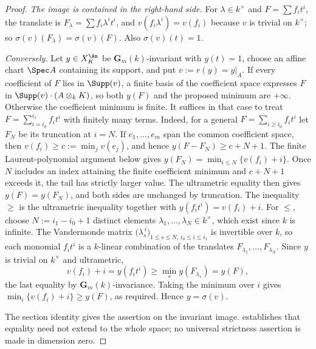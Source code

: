 \begin{proof}
\emph{The image is contained in the right-hand side.}  For
$\lambda\in k^\times$ and $F=\sum f_it^i$, the translate is
$F_\lambda=\sum f_i\lambda^it^i$, and
$v(f_i\lambda^i)=v(f_i)$ because $v$ is trivial on $k^\times$; so
$\sigma(v)(F_\lambda)=\sigma(v)(F)$.  Also $\sigma(v)(t)=1$.

\emph{Conversely.}  Let $y\in X_K^{\An}$ be $\mathbf G_m(k)$-invariant
with $y(t)=1$, choose an affine chart $\Spec A$ containing its support,
and put $v:=r(y)=y|_A$.  If every coefficient of $F$ lies in $\Supp(v)$, a finite basis of
the coefficient space expresses $F$ in
$\Supp(v)\cdot(A\otimes_kK)$, so both $y(F)$ and the proposed minimum
are $+\infty$.  Otherwise the coefficient minimum is finite.
It suffices in that case to treat
$F=\sum_{i=i_0}^{i_1}f_it^i$ with finitely many terms.  Indeed, for a
general $F=\sum_{i\geq i_0}f_it^i$ let $F_N$ be its truncation at
$i=N$.  If $e_1,\ldots,e_m$ span the common coefficient space, then
$v(f_i)\geq c:=\min_jv(e_j)$, and hence
$y(F-F_N)\geq c+N+1$.  The finite Laurent-polynomial argument below gives
$y(F_N)=\min_{i\leq N}\{v(f_i)+i\}$.
Once $N$ includes an index attaining the finite coefficient minimum
and $c+N+1$ exceeds it, the tail has strictly larger value.
The ultrametric equality then gives $y(F)=y(F_N)$, and both
sides are unchanged by truncation.  The
inequality $\geq$ is the ultrametric inequality together with
$y(f_it^i)=v(f_i)+i$.  For $\leq$, choose $N:=i_1-i_0+1$ distinct
elements $\lambda_1,\ldots,\lambda_N\in k^\times$, which exist since
$k$ is infinite.  The Vandermonde matrix
$\bigl(\lambda_s^{\,i}\bigr)_{1\leq s\leq N,\,i_0\leq i\leq i_1}$ is
invertible over $k$, so each monomial $f_it^i$ is a $k$-linear
combination of the translates $F_{\lambda_1},\ldots,F_{\lambda_N}$.  Since
$y$ is trivial on $k^\times$ and ultrametric,
\[
 v(f_i)+i=y(f_it^i)\geq\min_sy(F_{\lambda_s})=y(F),
\]
the last equality by $\mathbf G_m(k)$-invariance.  Taking the minimum over
$i$ gives $\min_i\{v(f_i)+i\}\geq y(F)$, as required.  Hence
$y=\sigma(v)$.

The section identity gives the assertion on the invariant image.
 establishes that equality need not
extend to the whole space; no universal strictness assertion is made
in dimension zero.
\end{proof}

